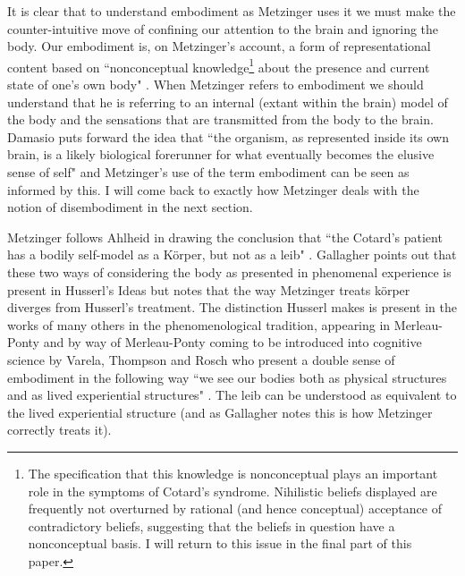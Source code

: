 It is clear that to understand embodiment as Metzinger uses it we must make the counter-intuitive move of confining our attention to the brain and ignoring the body. Our embodiment is, on Metzinger's account, a form of representational content based on ``nonconceptual knowledge\footnote{The specification that this knowledge is nonconceptual plays an important role in the symptoms of Cotard’s syndrome. Nihilistic beliefs displayed are frequently not overturned by rational (and hence conceptual) acceptance of contradictory beliefs, suggesting that the beliefs in question have a nonconceptual basis. I will return to this issue in the final part of this paper.} about the presence and current state of one's own body" \cite[p. 287]{metzinger2003}. When Metzinger refers to embodiment we should understand that he is referring to an internal (extant within the brain) model of the body and the sensations that are transmitted from the body to the brain. Damasio puts forward the idea that ``the organism, as represented inside its own brain, is a likely biological forerunner for what eventually becomes the elusive sense of self" \cite[p. 22]{damasio2000} and Metzinger's use of the term embodiment can be seen as informed by this. I will come back to exactly how Metzinger deals with the notion of disembodiment in the next section.

Metzinger follows Ahlheid \cite{ahlheid1968} in drawing the conclusion that ``the Cotard's patient has a bodily self-model as a K\"{o}rper, but not as a leib" \cite[p. 457]{metzinger2003}. Gallagher \cite{gallagher2005} points out that these two ways of considering the body as presented in phenomenal experience is present in Husserl's Ideas \cite{husserl1931} but notes that the way Metzinger treats k\"{o}rper diverges from Husserl's treatment. The distinction Husserl makes is present in the works of many others in the phenomenological tradition, appearing in Merleau-Ponty \cite{merleauponty1962} and by way of Merleau-Ponty coming to be introduced into cognitive science by Varela, Thompson and Rosch who present a double sense of embodiment in the following way ``we see our bodies both as physical structures and as lived experiential structures" \cite[p. 1]{varela1991}. The leib can be understood as equivalent to the lived experiential structure (and as Gallagher notes this is how Metzinger correctly treats it).

